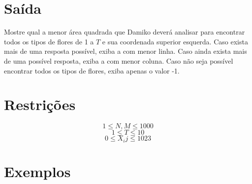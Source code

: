 \section*{Saída}

Mostre qual a menor área quadrada que Damiko deverá analisar para encontrar todos os tipos de flores de 1 a $T$ e sua coordenada superior esquerda. Caso exista mais de uma resposta possível, exiba a com menor linha. Caso ainda exista mais de uma possível resposta, exiba a com menor coluna. Caso não seja possível encontrar todos os tipos de flores, exiba apenas o valor -1.

\section*{Restrições}
$$1 \leq N,M \leq 1000$$
$$1 \leq T \leq 10$$
$$0 \leq X_ij \leq 1023$$

\section*{Exemplos}
\exemplo
